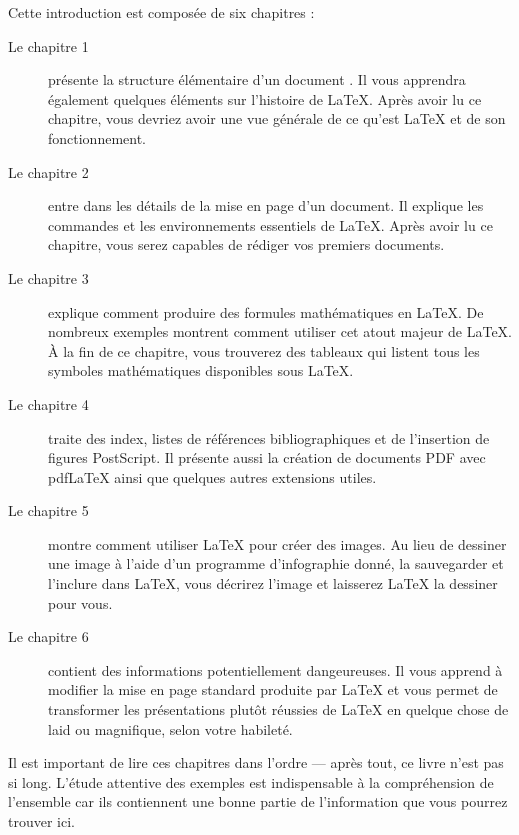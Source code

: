\bigskip
\noindent Cette introduction est composée de six chapitres :
\begin{description}

\item[Le chapitre 1] présente la structure élémentaire d'un document
  \LaTeXe{}. Il vous apprendra également quelques éléments sur
  l'histoire de \LaTeX{}. Après avoir lu ce chapitre, vous devriez
  avoir une vue générale de ce qu'est \LaTeX{} et de son
  fonctionnement.

\item[Le chapitre 2] entre dans les détails de la mise en page d'un
  document. Il explique les commandes et les environnements
  essentiels de \LaTeX{}. Après avoir lu ce chapitre, vous serez
  capables de rédiger vos premiers documents.

\item[Le chapitre 3] explique comment produire des formules
  mathématiques en \LaTeX{}. De nombreux exemples
  montrent comment utiliser cet atout majeur de \LaTeX{}. À la fin de ce
  chapitre, vous trouverez des tableaux qui listent tous les symboles
  mathématiques disponibles sous \LaTeX{}.

\item[Le chapitre 4] traite des index, listes de
  références bibliographiques et de l'insertion de figures
  PostScript. Il présente aussi la création de documents PDF avec
  pdf\LaTeX{} ainsi que quelques autres extensions utiles.

\item[Le chapitre 5] montre comment utiliser \LaTeX{} pour créer des
  images. Au lieu de dessiner une image à l'aide d'un programme
  d'infographie donné, la sauvegarder et l'inclure dans \LaTeX{}, vous
  décrirez l'image et laisserez \LaTeX{} la dessiner pour vous.

\item[Le chapitre 6] contient des informations potentiellement
  dangeureuses. Il vous apprend à modifier la mise en page standard
  produite par \LaTeX{} et vous  permet de transformer 
  les présentations plutôt réussies de \LaTeX{} en quelque chose
  de laid ou magnifique, selon votre habileté.
\end{description}

\bigskip
\noindent Il est important de lire ces chapitres dans l'ordre --- après
tout, ce livre n'est pas si long.  L'étude attentive des exemples
est indispensable à la compréhension de l'ensemble car ils contiennent
une bonne partie de l'information que vous pourrez trouver ici.

